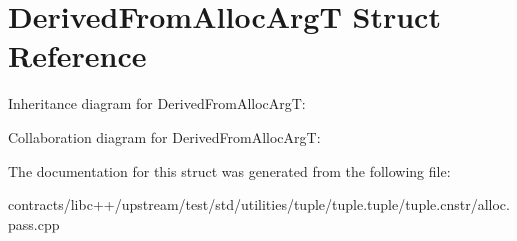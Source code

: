 \hypertarget{struct_derived_from_alloc_arg_t}{}\section{Derived\+From\+Alloc\+ArgT Struct Reference}
\label{struct_derived_from_alloc_arg_t}


Inheritance diagram for Derived\+From\+Alloc\+ArgT\+:


Collaboration diagram for Derived\+From\+Alloc\+ArgT\+:


The documentation for this struct was generated from the following file\+:\begin{DoxyCompactItemize}
\item 
contracts/libc++/upstream/test/std/utilities/tuple/tuple.\+tuple/tuple.\+cnstr/alloc.\+pass.\+cpp\end{DoxyCompactItemize}
